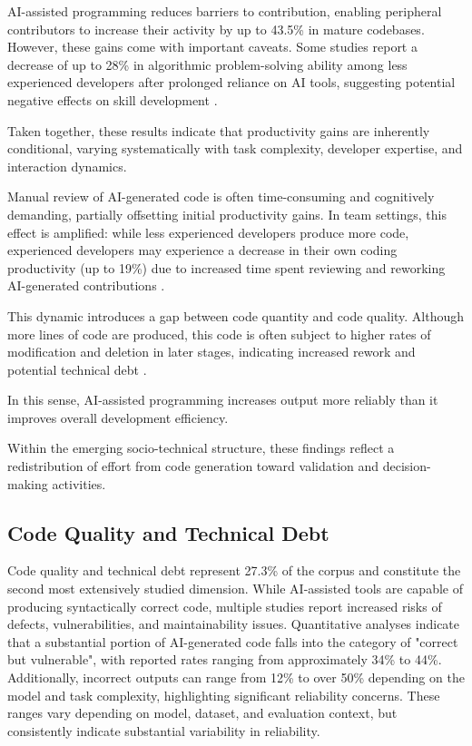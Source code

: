 \documentclass[conference]{IEEEtran}
\begin{document}
AI-assisted programming reduces barriers to contribution, enabling peripheral contributors to increase their activity by up to 43.5\% in mature codebases. However, these gains come with important caveats. Some studies report a decrease of up to 28\% in algorithmic problem-solving ability among less experienced developers after prolonged reliance on AI tools, suggesting potential negative effects on skill development \cite{xu_ai-assisted_2026, koripalli_copilot_2025}.

Taken together, these results indicate that productivity gains are inherently conditional, varying systematically with task complexity, developer expertise, and interaction dynamics.

Manual review of AI-generated code is often time-consuming and cognitively demanding, partially offsetting initial productivity gains. In team settings, this effect is amplified: while less experienced developers produce more code, experienced developers may experience a decrease in their own coding productivity (up to 19\%) due to increased time spent reviewing and reworking AI-generated contributions \cite{xu_ai-assisted_2026}.

This dynamic introduces a gap between code quantity and code quality. Although more lines of code are produced, this code is often subject to higher rates of modification and deletion in later stages, indicating increased rework and potential technical debt \cite{imai_is_2022}.

In this sense, AI-assisted programming increases output more reliably than it improves overall development efficiency.

Within the emerging socio-technical structure, these findings reflect a redistribution of effort from code generation toward validation and decision-making activities.

\subsection{Code Quality and Technical Debt}

Code quality and technical debt represent 27.3\% of the corpus and constitute the second most extensively studied dimension. While AI-assisted tools are capable of producing syntactically correct code, multiple studies report increased risks of defects, vulnerabilities, and maintainability issues. Quantitative analyses indicate that a substantial portion of AI-generated code falls into the category of "correct but vulnerable", with reported rates ranging from approximately 34\% to 44\%. Additionally, incorrect outputs can range from 12\% to over 50\% depending on the model and task complexity, highlighting significant reliability concerns. These ranges vary depending on model, dataset, and evaluation context, but consistently indicate substantial variability in reliability.
\end{document}
